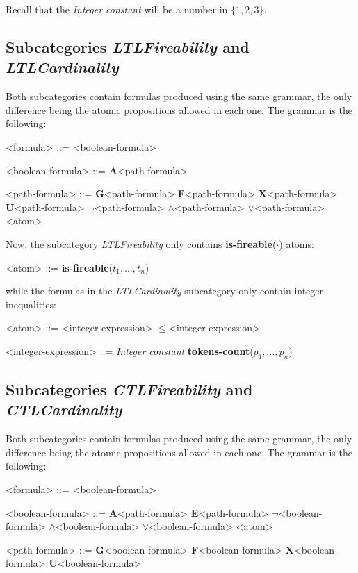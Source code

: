 \documentclass[10pt,english,a4paper]{article}
\newcommand\set[1]           {{\{ #1 \mathclose \}}}
\newcommand\ctla             {\textbf{A}\xspace}
\newcommand\ctle             {\textbf{E}\xspace}
\newcommand\ltlf             {\textbf{F}\xspace}
\newcommand\ltlg             {\textbf{G}\xspace}
\newcommand\ltlx             {\textbf{X}\xspace}
\newcommand\ltlu             {\textbf{U}\xspace}
\newcommand\logicnot         {\boldmath$\lnot$\xspace}
\newcommand\logicand         {\boldmath$\land$\xspace}
\newcommand\logicor          {\boldmath$\lor$\xspace}
\newcommand\atomleq          {\boldmath$\leq$\xspace}
\newcommand\atomisfire[1]    {\textbf{is-fireable}(#1)}
\newcommand\atomtokenscnt[1] {\textbf{tokens-count}(#1)}
\newcommand\mysubsection[1]{\color{sectioncolor}\subsection{#1}\color{defaultcolor}}
\begin{document}
Recall that the \textit{Integer constant} will be a number in $\set{1,2,3}$.


\mysubsection{Subcategories \textit{LTLFireability} and \textit{LTLCardinality}}

Both subcategories contain formulas produced using the same grammar, the
only difference being the atomic propositions allowed in each one.
The grammar is the following:

\begin{grammar}

<formula> ::= <boolean-formula>

<boolean-formula> ::= \ctla <path-formula>

<path-formula> ::=
     \ltlg <path-formula>
\alt \ltlf <path-formula>
\alt \ltlx <path-formula>
 \ltlu <path-formula>
\alt \logicnot <path-formula>
 \logicand <path-formula>
 \logicor <path-formula>
\alt <atom>

\end{grammar}

Now, the subcategory \emph{LTLFireability} only contains
\atomisfire{$\cdot$} atoms:

\begin{grammar}
<atom> ::= \atomisfire{$t_1, \ldots, t_n$}
\end{grammar}

while the formulas in the \emph{LTLCardinality} subcategory only contain
integer inequalities:

\begin{grammar}
<atom> ::= <integer-expression> \atomleq <integer-expression>

<integer-expression> ::= \textit{Integer constant}
\alt \atomtokenscnt{$p_1, \ldots, p_n$}
\end{grammar}


\mysubsection{Subcategories \emph{CTLFireability} and \emph{CTLCardinality}}

Both subcategories contain formulas produced using the same grammar, the
only difference being the atomic propositions allowed in each one.
The grammar is the following:

\begin{grammar}
<formula> ::= <boolean-formula>

<boolean-formula> ::=
     \ctla <path-formula>
\alt \ctle <path-formula>
\alt \logicnot <boolean-formula>
 \logicand <boolean-formula>
 \logicor <boolean-formula>
\alt <atom>

<path-formula> ::=
     \ltlg <boolean-formula>
\alt \ltlf <boolean-formula>
\alt \ltlx <boolean-formula>
 \ltlu <boolean-formula>
\end{grammar}
\end{document}
